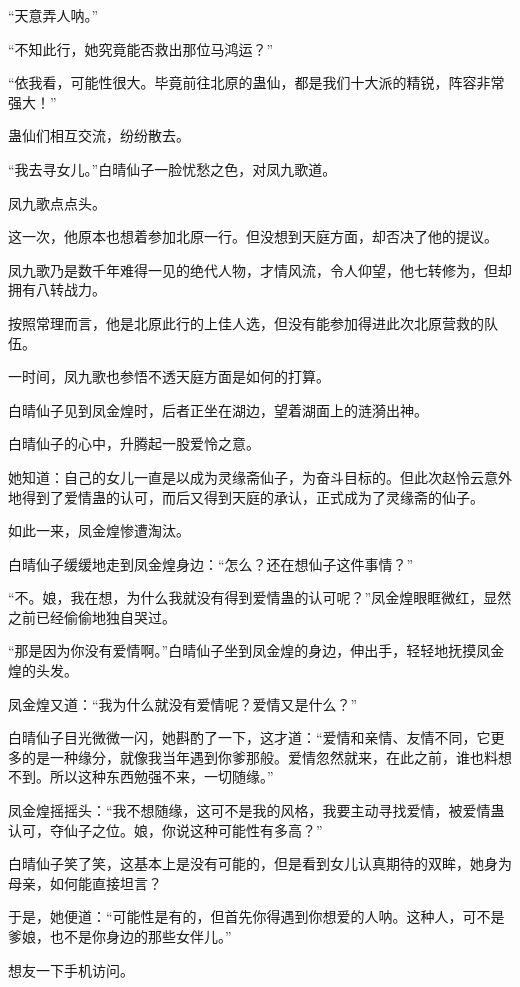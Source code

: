 \begin{this_body}
“天意弄人呐。”

“不知此行，她究竟能否救出那位马鸿运？”

“依我看，可能性很大。毕竟前往北原的蛊仙，都是我们十大派的精锐，阵容非常强大！”

蛊仙们相互交流，纷纷散去。

“我去寻女儿。”白晴仙子一脸忧愁之色，对凤九歌道。

凤九歌点点头。

这一次，他原本也想着参加北原一行。但没想到天庭方面，却否决了他的提议。

凤九歌乃是数千年难得一见的绝代人物，才情风流，令人仰望，他七转修为，但却拥有八转战力。

按照常理而言，他是北原此行的上佳人选，但没有能参加得进此次北原营救的队伍。

一时间，凤九歌也参悟不透天庭方面是如何的打算。

白晴仙子见到凤金煌时，后者正坐在湖边，望着湖面上的涟漪出神。

白晴仙子的心中，升腾起一股爱怜之意。

她知道：自己的女儿一直是以成为灵缘斋仙子，为奋斗目标的。但此次赵怜云意外地得到了爱情蛊的认可，而后又得到天庭的承认，正式成为了灵缘斋的仙子。

如此一来，凤金煌惨遭淘汰。

白晴仙子缓缓地走到凤金煌身边：“怎么？还在想仙子这件事情？”

“不。娘，我在想，为什么我就没有得到爱情蛊的认可呢？”凤金煌眼眶微红，显然之前已经偷偷地独自哭过。

“那是因为你没有爱情啊。”白晴仙子坐到凤金煌的身边，伸出手，轻轻地抚摸凤金煌的头发。

凤金煌又道：“我为什么就没有爱情呢？爱情又是什么？”

白晴仙子目光微微一闪，她斟酌了一下，这才道：“爱情和亲情、友情不同，它更多的是一种缘分，就像我当年遇到你爹那般。爱情忽然就来，在此之前，谁也料想不到。所以这种东西勉强不来，一切随缘。”

凤金煌摇摇头：“我不想随缘，这可不是我的风格，我要主动寻找爱情，被爱情蛊认可，夺仙子之位。娘，你说这种可能性有多高？”

白晴仙子笑了笑，这基本上是没有可能的，但是看到女儿认真期待的双眸，她身为母亲，如何能直接坦言？

于是，她便道：“可能性是有的，但首先你得遇到你想爱的人呐。这种人，可不是爹娘，也不是你身边的那些女伴儿。”

想友一下手机访问。

\end{this_body}

